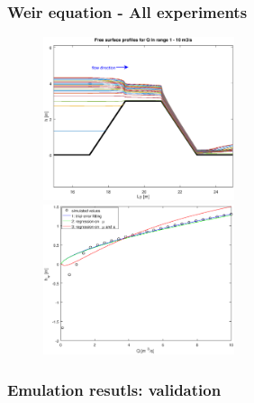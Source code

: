 \documentclass[xcolor=dvipsnames, USenglish]{beamer}  %
\begin{document}
  \begin{frame}
    \frametitle{Weir equation - All experiments}
      \begin{figure}[t]
        \includegraphics[width=0.5\textwidth]{img/free_surfaces_all.eps}
        \includegraphics[width=0.5\textwidth]{img/points_interpolations_all.eps}
      \end{figure}
  \end{frame}

  \begin{frame}
    \frametitle{Emulation resutls: validation}
    \begin{table}
    \centering
    \end{table}
  \end{frame}
\end{document}
